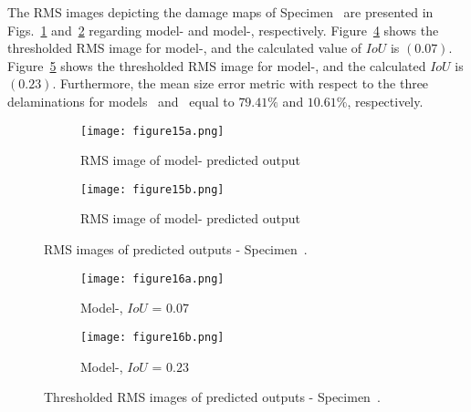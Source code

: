 The RMS images depicting the damage maps of Specimen~ are presented in Figs.~\ref{fig:RMS_L3_S4_B_saeed} and~\ref{fig:RMS_L3_S4_B_ijjeh} regarding model- and model-, respectively.
Figure~\ref{fig:RMS_threshold_L3_S4_B_saeed} shows the thresholded RMS image for model-, and the calculated value of \(IoU\) is \((0.07)\).
Figure~\ref{fig:RMS_threshold_L3_S4_B_ijjeh}  shows the thresholded RMS image for model-, and the calculated \(IoU\) is \((0.23)\).
Furthermore, the mean size error metric with respect to the three delaminations for models~ and~ equal to \(79.41\%\) and \(10.61\%\), respectively.
\begin{figure} [!h]
	\begin{subfigure}[b]{.49\textwidth}
		\centering
		\texttt{[image: figure15a.png]}
		\caption{RMS image of model- predicted output}
		\label{fig:RMS_L3_S4_B_saeed}
	\end{subfigure}
	\hfill
	\begin{subfigure}[b]{.49\textwidth}
		\centering
		\texttt{[image: figure15b.png]}
		\caption{RMS image of model- predicted output} 
		\label{fig:RMS_L3_S4_B_ijjeh}
	\end{subfigure}
	\caption{RMS images of predicted outputs - Specimen~.}
	\label{fig:RMS_L3_S4_B__images}
\end{figure} 
\begin{figure} [!h]
	\begin{subfigure}[b]{.49\textwidth}
		\centering
		\texttt{[image: figure16a.png]}
		\caption{Model-, \(IoU\) = \(0.07\)}
		\label{fig:RMS_threshold_L3_S4_B_saeed}
	\end{subfigure}
	\hfill
	\begin{subfigure}[b]{.49\textwidth}
		\centering
		\texttt{[image: figure16b.png]}
		\caption{Model-, \(IoU\) = \(0.23\)} 
		\label{fig:RMS_threshold_L3_S4_B_ijjeh}
	\end{subfigure}
	\caption{Thresholded RMS images of predicted outputs - Specimen~.}
	\label{fig:RMS_threshold_L3_S4_B__images}
\end{figure} 
